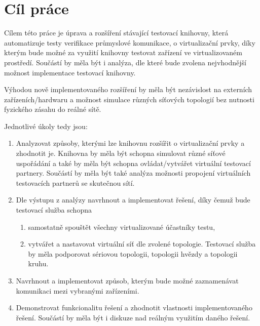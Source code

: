 \chapter{Cíl práce}\label{chap:cil}

Cílem této práce je úprava a rozšíření stávající testovací knihovny, která automatizuje testy verifikace průmyslové komunikace, o virtualizační prvky, díky kterým bude možné za využití knihovny testovat zařízení ve virtualizovaném prostředí. Součástí by měla být i analýza, dle které bude zvolena nejvhodnější možnost implementace testovací knihovny.

Výhodou nově implementovaného rozšíření by měla být nezávislost na externích zařízeních/hardwaru a možnost simulace různých síťových topologií bez nutnosti fyzického zásahu do reálné sítě.

Jednotlivé úkoly tedy jsou:
\begin{enumerate}
    \item Analyzovat způsoby, kterými lze knihovnu rozšířit o virtualizační prvky a zhodnotit je. Knihovna by měla být schopna simulovat různé síťové uspořádání a také by měla být schopna ovládat/vytvářet virtuální testovací partnery. Součástí by měla být také analýza možnosti propojení virtuálních testovacích partnerů se skutečnou sítí.
    \item Dle výstupu z analýzy navrhnout a implementovat řešení, díky čemuž bude testovací služba schopna
          \begin{enumerate}
              \item samostatně spouštět všechny virtualizované účastníky testu,
              \item vytvářet a nastavovat virtuální síť dle zvolené topologie. Testovací služba by měla podporovat sériovou topologii, topologii hvězdy a topologii kruhu.
          \end{enumerate}
    \item Navrhnout a implementovat způsob, kterým bude možné zaznamenávat komunikaci mezi vybranými zařízeními.
    \item Demonstrovat funkcionalitu řešení a zhodnotit vlastnosti implementovaného řešení. Součástí by měla být i diskuze nad reálným využitím daného řešení.
\end{enumerate}
